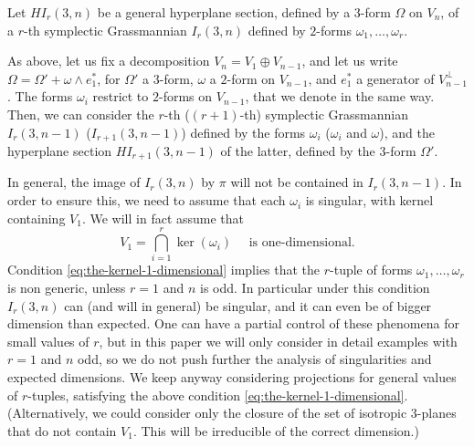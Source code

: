 \documentclass[JEP,XML,SOM,Unicode,NoEqCountersInSection]{cedram}
\theoremstyle{plain}
\theoremstyle{definition}
\begin{document}
Let $HI_r(3,n)$ be a general hyperplane
section, defined by a 3-form $\Omega$ on $V_n$, of a $r$-th symplectic Grassmannian $I_r(3,n)$ defined by $2$-forms $\omega_1,\ldots,\omega_r$.

As above, let us fix a decomposition $V_n=V_1 \oplus V_{n-1}$, and let us write
$\Omega = \Omega' + \omega \wedge e_1^*$, for $\Omega'$ a $3$-form, $\omega$ a $2$-form on $V_{n-1}$, and $e_1^*$ a generator of $V_{n-1}^\perp$.
The forms $\omega_i$ restrict to $2$-forms on $V_{n-1}$, that we denote in the same way.
Then, we can consider the $r$-th (\resp $(r+1)$-th) symplectic Grassmannian $I_r(3,n-1)$ (\resp $I_{r+1}(3,n-1)$) defined by the forms $\omega_i$ (\resp $\omega_i$ and $\omega$), and the hyperplane section $HI_{r+1}(3,n-1)$ of the latter, defined by the $3$-form $\Omega'$.

In general, the image of $I_r(3,n)$ by $\pi$ will not be contained in $I_r(3,n-1)$. In order
to ensure this, we need to assume that each $\omega_i$ is singular, with kernel containing $V_1$.
We will in fact assume that
\begin{equation}\label{eq:the-kernel-1-dimensional}
V_1 = \bigcap_{i=1}^r \ker(\omega_i) \quad \text{ is one-dimensional.}
\end{equation}
Condition \eqref{eq:the-kernel-1-dimensional} implies that the $r$-tuple of
forms $\omega_1,\ldots ,\omega_r$ is non generic,
unless $r=1$ and $n$ is odd.
In particular under this condition $I_r(3,n)$ can (and will in general) be singular,
and it can even be of bigger dimension than expected. One can have a
partial control of these phenomena for small values of $r$, but in this paper we will only
consider in detail examples with $r=1$ and $n$ odd, so we do not push further the analysis of singularities and expected dimensions. We keep anyway considering projections for general values of $r$-tuples,
satisfying the above condition \eqref{eq:the-kernel-1-dimensional}.
(Alternatively, we could consider only the closure of the set of isotropic
$3$-planes that do not contain $V_1$. This will be irreducible of the correct dimension.)
\end{document}
